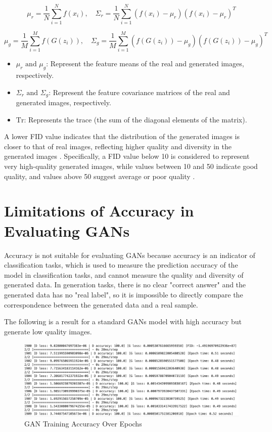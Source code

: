\begin{equation}
    \mu_r = \frac{1}{N} \sum_{i=1}^{N} f(x_i), \quad \Sigma_r = \frac{1}{N} \sum_{i=1}^{N} (f(x_i) - \mu_r)(f(x_i) - \mu_r)^T
\end{equation}

\begin{equation}
    \mu_g = \frac{1}{M} \sum_{i=1}^{M} f(G(z_i)), \quad \Sigma_g = \frac{1}{M} \sum_{i=1}^{M} (f(G(z_i)) - \mu_g)(f(G(z_i)) - \mu_g)^T
\end{equation}


\begin{itemize}
    \item $\mu_r \text{ and } \mu_g$: Represent the feature means of the real and generated images, respectively.
    \item $\Sigma_r \text{ and } \Sigma_g$: Represent the feature covariance matrices of the real and generated images, respectively.
    \item $\text{Tr}$: Represents the trace (the sum of the diagonal elements of the matrix).
\end{itemize}


A lower FID value indicates that the distribution of the generated images is closer to that of real images, 
reflecting higher quality and diversity in the generated images \citep{10.1117/12.2673366}. 
Specifically, a FID value below 10 is considered to represent very high-quality generated images, 
while values between 10 and 50 indicate good quality, and values above 50 suggest average or poor quality \citep{10.1117/12.2673366}.



\section{Limitations of Accuracy in Evaluating GANs}
Accuracy is not suitable for evaluating GANs because accuracy is an indicator of classification tasks, 
which is used to measure the prediction accuracy of the model in classification tasks, and cannot 
measure the quality and diversity of generated data. In generation tasks, there is no clear 
"correct answer" and the generated data has no "real label", so it is impossible to directly 
compare the correspondence between the generated data and a real sample. 

The following is a result for a standard GANs model with high accuracy but generate low quality images.


\begin{figure}[H]
    \centering
    \includegraphics[width=1.2\linewidth]{./Images/model_accuracy.jpg}
    \caption{GAN Training Accuracy Over Epochs}
    \label{fig:my_picture}
\end{figure}

